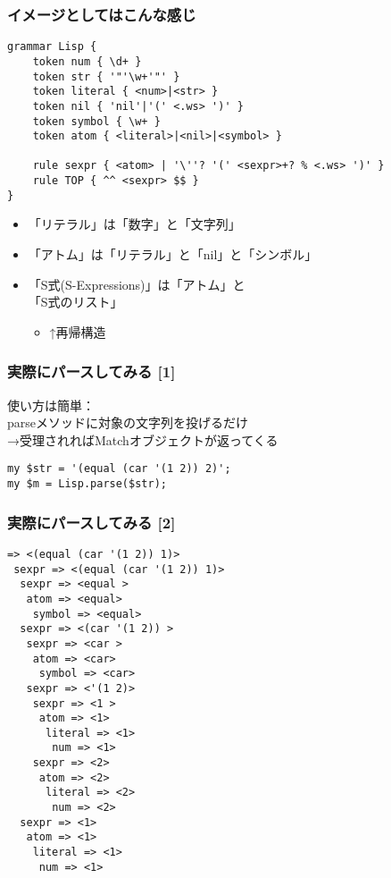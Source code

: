 \documentclass[14pt,dvipdfm,trans]{beamer}
\begin{document}
\begin{frame}[fragile]
 \frametitle{イメージとしてはこんな感じ}
 \begin{lstlisting}
grammar Lisp {
    token num { \d+ }
    token str { '"'\w+'"' }
    token literal { <num>|<str> }
    token nil { 'nil'|'(' <.ws> ')' }
    token symbol { \w+ }
    token atom { <literal>|<nil>|<symbol> }

    rule sexpr { <atom> | '\''? '(' <sexpr>+? % <.ws> ')' }
    rule TOP { ^^ <sexpr> $$ }
}
 \end{lstlisting} 
\pause
\begin{itemize}
 \item <2-> 「リテラル」は「数字」と「文字列」
 \item <3-> 「アトム」は「リテラル」と「nil」と「シンボル」
 \vspace{0.2zh}
 \item <4-> 「S式(S-Expressions)」は「アトム」と\\「S式のリスト」
 \vspace{0.5zh}
       \begin{itemize}
	\item <5-> ↑再帰構造
       \end{itemize}
\end{itemize}

\end{frame}

\begin{frame}[fragile]
 \frametitle{実際にパースしてみる [1]}
使い方は簡単：\\
\hspace{1zh}parseメソッドに対象の文字列を投げるだけ\\
\hspace{1zh}→受理されればMatchオブジェクトが返ってくる
\vspace{3zh}
\begin{lstlisting}
my $str = '(equal (car '(1 2)) 2)';
my $m = Lisp.parse($str);
\end{lstlisting}
\end{frame}

\begin{frame}[fragile]
 \frametitle{実際にパースしてみる [2]}
\begin{lstlisting}
=> <(equal (car '(1 2)) 1)>
 sexpr => <(equal (car '(1 2)) 1)>
  sexpr => <equal >
   atom => <equal>
    symbol => <equal>
  sexpr => <(car '(1 2)) >
   sexpr => <car >
    atom => <car>
     symbol => <car>
   sexpr => <'(1 2)>
    sexpr => <1 >
     atom => <1>
      literal => <1>
       num => <1>
    sexpr => <2>
     atom => <2>
      literal => <2>
       num => <2>
  sexpr => <1>
   atom => <1>
    literal => <1>
     num => <1>
\end{lstlisting}
\end{frame}
\end{document}
